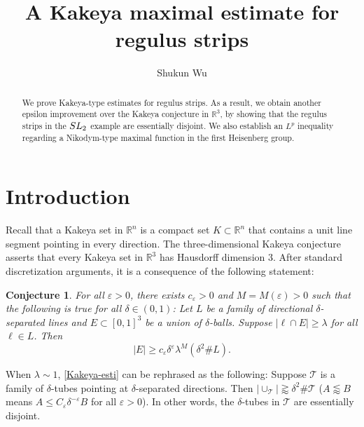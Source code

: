 \documentclass{amsart}%
\numberwithin{equation}{section}
\newtheorem{conjecture}[theorem]{Conjecture}
\newcommand{\de}{\delta}
\newcommand{\e}{\varepsilon}
\newcommand{\la}{\lambda}
\newcommand{\ZR}{\mathbb{R}}
\newcommand{\cT}{{\mathcal T}}
\newcommand{\1}{\mathbbm{1}}
\begin{document}
\title{A Kakeya maximal estimate for regulus strips}


\author{Shukun Wu}

\address{Department of Mathematics, Indiana University Bloomington}





\date{}
\begin{abstract}




We prove Kakeya-type estimates for regulus strips. 
As a result, we obtain another epsilon improvement over the Kakeya conjecture in $\ZR^3$, by showing that the regulus strips in the ${\rm SL}_2$ example are essentially disjoint.
We also establish an $L^p$ inequality regarding a Nikodym-type maximal function in the first Heisenberg group.


\end{abstract}

\maketitle



\section{Introduction}


Recall that a Kakeya set in $\ZR^n$ is a compact set $K\subset\ZR^n$ that contains a unit line segment pointing in every direction.
The three-dimensional Kakeya conjecture asserts that every Kakeya set in $\ZR^3$ has Hausdorff dimension 3.
After standard discretization arguments, it is a consequence of the following statement:
\begin{conjecture}
\label{Kakeya-discretized}
For all $\e>0$, there exists $c_\e>0$ and $M=M(\e)>0$ such that the following is true for all $\de\in(0,1)$:
Let $L$ be a family of directional $\de$-separated lines and $E\subset[0,1]^3$ be a union of $\de$-balls.
Suppose $|\ell\cap E|\geq\la$ for all $\ell\in L$.
Then
\begin{equation}
\label{Kakeya-esti}
    |E|\geq c_\e \de^{\e}\la^M(\de^2\# L).
\end{equation}
\end{conjecture}

\noindent When $\la\sim 1$, \eqref{Kakeya-esti} can be rephrased as the following: 
Suppose $\cT$ is a family of $\de$-tubes pointing at $\de$-separated directions.
Then $|\cup_\cT|\gtrapprox \de^2\#\cT$ ($A\lessapprox B$ means $A\leq C_\e\de^{-\e}B$ for all $\e>0$).
In other words, the $\de$-tubes in $\cT$ are essentially disjoint.
\end{document}
